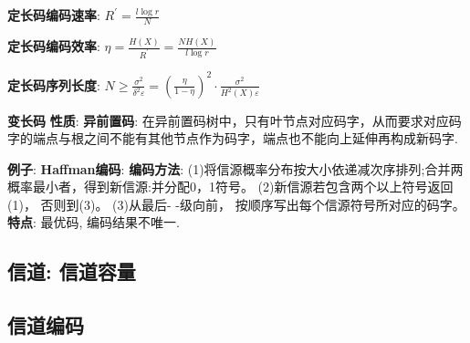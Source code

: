 \documentclass{article}
\begin{document}
                \textbf{定长码编码速率}: $R^{\prime}=\frac{l \log r}{N}$

                \textbf{定长码编码效率}: $\eta=\frac{H(X)}{R^{\prime}}=\frac{N H(X)}{l \log r}$
                
                \textbf{定长码序列长度}: $N \geqslant \frac{\sigma^{2}}{\delta^{2} \varepsilon}=\left(\frac{\eta}{1-\eta}\right)^{2} \cdot \frac{\sigma^{2}}{H^{2}(X) \varepsilon}$

        \textbf{变长码}  
            \textbf{性质}:
                \textbf{异前置码}: 在异前置码树中，只有叶节点对应码字，从而要求对应码字的端点与根之间不能有其他节点作为码字，端点也不能向上延伸再构成新码字.
                
            \textbf{例子}:
                \textbf{Haffman编码}:
                    \textbf{编码方法}:
                        (1)将信源概率分布按大小依递减次序排列;合并两概率最小者，得到新信源:并分配0，1符号。
                        (2)新信源若包含两个以上符号返回(1)， 否则到(3)。
                        (3)从最后- -级向前， 按顺序写出每个信源符号所对应的码字。
                    \textbf{特点}:
                        最优码, 编码结果不唯一.
                    
                    

        
    \subsection{信道: 信道容量}
    
    \subsection{信道编码}
        
\end{document}
